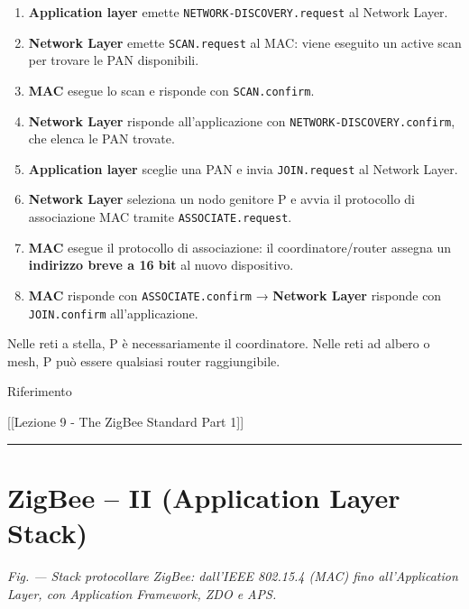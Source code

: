 \documentclass[
  italian,
  openany]{book}
\providecommand{\tightlist}{%
  \setlength{\itemsep}{0pt}\setlength{\parskip}{0pt}}
\begin{document}
\begin{enumerate}
\def\labelenumi{\arabic{enumi}.}
\tightlist
\item
  \textbf{Application layer} emette \texttt{NETWORK-DISCOVERY.request}
  al Network Layer.
\item
  \textbf{Network Layer} emette \texttt{SCAN.request} al MAC: viene
  eseguito un active scan per trovare le PAN disponibili.
\item
  \textbf{MAC} esegue lo scan e risponde con \texttt{SCAN.confirm}.
\item
  \textbf{Network Layer} risponde all'applicazione con
  \texttt{NETWORK-DISCOVERY.confirm}, che elenca le PAN trovate.
\item
  \textbf{Application layer} sceglie una PAN e invia
  \texttt{JOIN.request} al Network Layer.
\item
  \textbf{Network Layer} seleziona un nodo genitore P e avvia il
  protocollo di associazione MAC tramite \texttt{ASSOCIATE.request}.
\item
  \textbf{MAC} esegue il protocollo di associazione: il
  coordinatore/router assegna un \textbf{indirizzo breve a 16 bit} al
  nuovo dispositivo.
\item
  \textbf{MAC} risponde con \texttt{ASSOCIATE.confirm} → \textbf{Network
  Layer} risponde con \texttt{JOIN.confirm} all'applicazione.
\end{enumerate}

Nelle reti a stella, P è necessariamente il coordinatore. Nelle reti ad
albero o mesh, P può essere qualsiasi router raggiungibile.

\begin{calloutnote}{Riferimento}

{[}{[}Lezione 9 - The ZigBee Standard Part 1{]}{]}

\end{calloutnote}

\begin{center}\rule{0.5\linewidth}{0.5pt}\end{center}

\section{ZigBee -- II (Application Layer
Stack)}\label{zigbee-ii-application-layer-stack}

\emph{Fig. --- Stack protocollare ZigBee: dall'IEEE 802.15.4 (MAC) fino
all'Application Layer, con Application Framework, ZDO e APS.}
\end{document}
